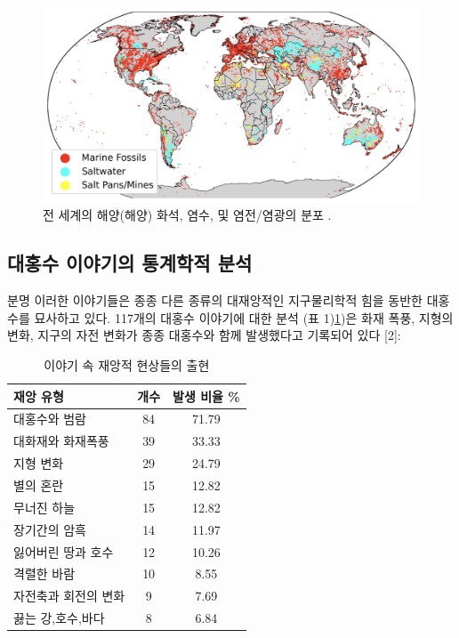 \documentclass[10pt,twocolumn,letterpaper]{article}
\begin{document}
\begin{figure}[b]
\begin{center}
\includegraphics[width=1\textwidth]{marine.jpg}
\end{center}
   \caption{전 세계의 해양(해양) 화석, 염수, 및 염전/염광의 분포 \cite{15,16,86,87}.}
   \label{fig:2}
\end{figure}

\subsection{대홍수 이야기의 통계학적 분석}

분명  이러한 이야기들은 종종 다른 종류의 대재앙적인 지구물리학적 힘을 동반한 대홍수를 묘사하고 있다. 117개의 대홍수 이야기에 대한 분석 (표 1)\ref{tab: 1})은 화재 폭풍, 지형의 변화, 지구의 자전 변화가 종종 대홍수와 함께 발생했다고 기록되어 있다 [2]\cite{14}:

\begin{table}[ht]
\begin{center}
\renewcommand{\arraystretch}{1.2}  
\begin{tabular}{|l|c|c|}
\hline
\textbf{재앙 유형} & \textbf{개수} & \textbf{발생 비율 \%} \\
\hline\hline
대홍수와 범람                   & 84 & 71.79 \\
대화재와 화재폭풍         & 39 & 33.33 \\
지형 변화               & 29 & 24.79 \\
별의 혼란               & 15 & 12.82 \\
무너진 하늘               & 15 & 12.82 \\
장기간의 암흑               & 14 & 11.97 \\
잃어버린 땅과 호수      & 12 & 10.26 \\
격렬한 바람           & 10 & 8.55  \\
자전축과 회전의 변화            & 9 & 7.69  \\
끓는 강,호수,바다       & 8 & 6.84 \\
\hline
\end{tabular}
\end{center}
\caption{이야기 속 재앙적 현상들의 출현 }
\label{tab: 1}
\end{table}
\end{document}
